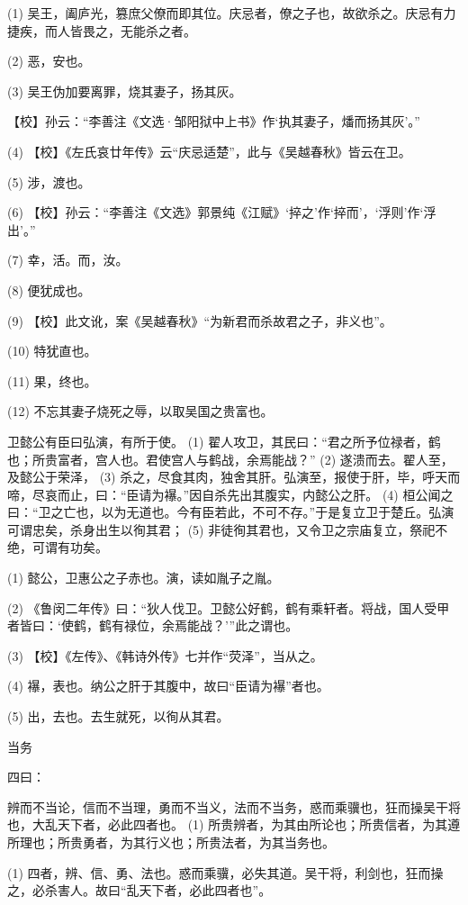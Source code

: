 \documentclass[12pt,UTF8]{ctexbook}
\begin{document}
(1) 吴王，阖庐光，篡庶父僚而即其位。庆忌者，僚之子也，故欲杀之。庆忌有力捷疾，而人皆畏之，无能杀之者。

(2) 恶，安也。

(3) 吴王伪加要离罪，烧其妻子，扬其灰。

【校】孙云：“李善注《文选·邹阳狱中上书》作‘执其妻子，燔而扬其灰’。”

(4) 【校】《左氏哀廿年传》云“庆忌适楚”，此与《吴越春秋》皆云在卫。

(5) 涉，渡也。

(6) 【校】孙云：“李善注《文选》郭景纯《江赋》‘捽之’作‘捽而’，‘浮则’作‘浮出’。”

(7) 幸，活。而，汝。

(8) 便犹成也。

(9) 【校】此文讹，案《吴越春秋》“为新君而杀故君之子，非义也”。

(10) 特犹直也。

(11) 果，终也。

(12) 不忘其妻子烧死之辱，以取吴国之贵富也。

卫懿公有臣曰弘演，有所于使。 (1) 翟人攻卫，其民曰：“君之所予位禄者，鹤也；所贵富者，宫人也。君使宫人与鹤战，余焉能战？” (2) 遂溃而去。翟人至，及懿公于荣泽， (3) 杀之，尽食其肉，独舍其肝。弘演至，报使于肝，毕，呼天而啼，尽哀而止，曰：“臣请为襮。”因自杀先出其腹实，内懿公之肝。 (4) 桓公闻之曰：“卫之亡也，以为无道也。今有臣若此，不可不存。”于是复立卫于楚丘。弘演可谓忠矣，杀身出生以徇其君； (5) 非徒徇其君也，又令卫之宗庙复立，祭祀不绝，可谓有功矣。

(1) 懿公，卫惠公之子赤也。演，读如胤子之胤。

(2) 《鲁闵二年传》曰：“狄人伐卫。卫懿公好鹤，鹤有乘轩者。将战，国人受甲者皆曰：‘使鹤，鹤有禄位，余焉能战？’”此之谓也。

(3) 【校】《左传》、《韩诗外传》七并作“荧泽”，当从之。

(4) 襮，表也。纳公之肝于其腹中，故曰“臣请为襮”者也。

(5) 出，去也。去生就死，以徇从其君。





当务


四曰：

辨而不当论，信而不当理，勇而不当义，法而不当务，惑而乘骥也，狂而操吴干将也，大乱天下者，必此四者也。 (1) 所贵辨者，为其由所论也；所贵信者，为其遵所理也；所贵勇者，为其行义也；所贵法者，为其当务也。

(1) 四者，辨、信、勇、法也。惑而乘骥，必失其道。吴干将，利剑也，狂而操之，必杀害人。故曰“乱天下者，必此四者也”。
\end{document}
